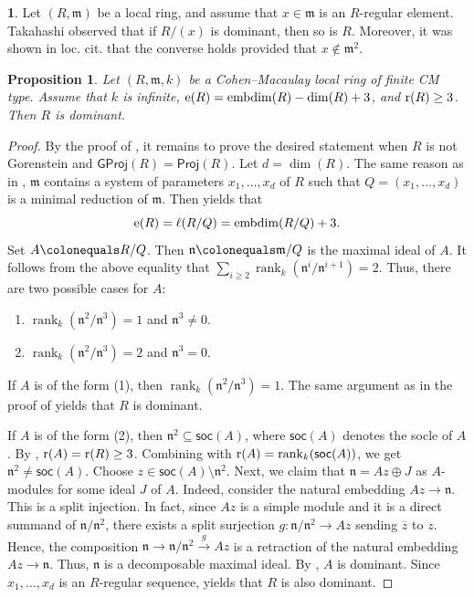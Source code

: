\documentclass{amsart}
\DeclareMathOperator{\rank}{rank}
\DeclareMathOperator{\embdim}{embdim}
\newcommand{\n}{\mathfrak{n}}
\newcommand{\0}{{\bf{0}}}
\newcommand{\m}{\mathfrak{m}}
\newcommand{\soc}{\mathsf{soc}}
\newcommand{\Proj}{\mathsf{Proj}}
\newcommand{\GProj}{\mathsf{GProj}}
\newtheorem{proposition}[theorem]{Proposition}
\theoremstyle{definition}
\newtheorem{chunk}[theorem]{}
\begin{document}
\begin{chunk}\label{test}
   Let $(R,\m)$ be a local ring, and assume that $x\in\m$ is an $R$-regular element. Takahashi \cite[Theorem 5.6]{Takahashi:2023} observed that if $R/(x)$ is dominant, then so is $R$. Moreover, it was shown in loc. cit. that the converse holds provided that $x\notin\m^2$.
\end{chunk}
\begin{proposition}\label{three}
      Let $(R,\m,k)$ be a Cohen--Macaulay local ring of finite CM type. Assume that $k$ is infinite, ${\rm e}(R)=\embdim(R)-\dim(R)+3$, and ${\rm r}(R)\geq 3$. Then $R$ is dominant. 
\end{proposition}
\begin{proof}
    By the proof of , it remains to prove the desired statement when $R$ is not Gorenstein and $\GProj(R)=\Proj(R)$.   Let $d=\dim(R)$. The same reason as in , $\m$ contains a system of parameters $x_1,\ldots,x_d$ of $R$ such that $Q=(x_1,\ldots,x_d)$ is a minimal reduction of $\m$. Then  yields that
   $$
   {\rm e}(R)=\ell(R/Q)=\embdim(R/Q)+3. 
   $$
   Set $A\colonequals R/Q$. Then $\n\colonequals \m/Q$ is the maximal ideal of $A$. It follows from  the above equality that $\sum_{i\geq 2}\rank_k(\n^i/\n^{i+1})=2$. Thus, there are two possible cases for $A$:  
   \begin{enumerate}
       \item $\rank_k(\n^2/\n^{3})=1$ and $\n^3\neq 0$.

       \item $\rank_k(\n^2/\n^3)=2$ and $\n^3=0$. 
   \end{enumerate}
   
If $A$ is of the form (1), then $\rank_k(\n^2/\n^{3})=1$. The same argument as in the proof of  yields that $R$ is dominant.

If $A$ is of the form (2), then $\n^2\subseteq \soc(A)$, where $\soc(A)$ denotes the socle of $A$. By \cite[Lemma 3.1.16]{BH}, ${\rm r}(A)={\rm r}(R)\geq 3$.  Combining with ${\rm r}(A)=\rank_k(\soc(A))$, we get $\n^2\neq \soc(A)$. Choose $z\in \soc(A)\setminus \n^2$. Next, we claim that $\n=Az\oplus J$ as $A$-modules for some ideal $J$ of $A$. Indeed, consider the natural embedding $Az\to \n$. This is a split injection. In fact, since $Az$ is a simple module and it is a direct summand of $\n/\n^2$, there exists a split surjection $g\colon \n/\n^2\to Az$ sending $\overline{z}$ to $z$. Hence, the composition
$
\n\rightarrow \n/\n^2\xrightarrow{g}Az
$
is a retraction of the natural embedding $Az\to \n$. Thus, $\n$ is a decomposable maximal ideal. By , $A$ is dominant. Since $x_1,\ldots,x_d$ is an $R$-regular sequence,  yields that $R$ is also dominant. 
\end{proof}
\end{document}

